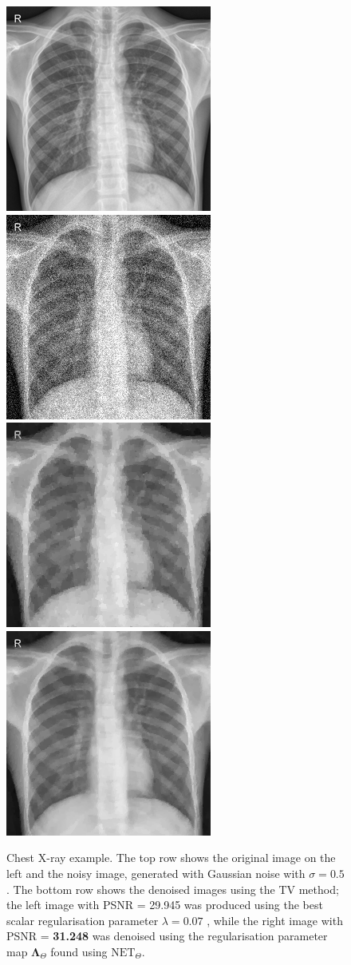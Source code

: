 \documentclass[12pt]{article}
\begin{document}
\begin{figure}[H]
  \centering
  \includegraphics[width=0.34\linewidth]{images//chest_xray/ex_2/clean.png}
  \includegraphics[width=0.34\linewidth]{images//chest_xray/ex_2/noisy.png}
  \includegraphics[width=0.34\linewidth]{images//chest_xray/ex_2/psnr_29.945-lambda_0.07.png}
  \includegraphics[width=0.34\linewidth]{images//chest_xray/ex_2/denoised-mse_49.17-psnr_31.248-ssim_0.831.png}
  \caption{Chest X-ray example. The top row shows the original image on the left and the noisy image, generated with Gaussian noise with $\sigma = 0.5$. The bottom row shows the denoised images using the TV method; the left image with PSNR = 29.945 was produced using the best scalar regularisation parameter $\lambda = 0.07$ , while the right image with PSNR = \textbf{31.248} was denoised using the regularisation parameter map $\mathbf{\Lambda}_\Theta$ found using $\text{NET}_\Theta$.}
  \label{fig:compare}
\end{figure}
\end{document}
